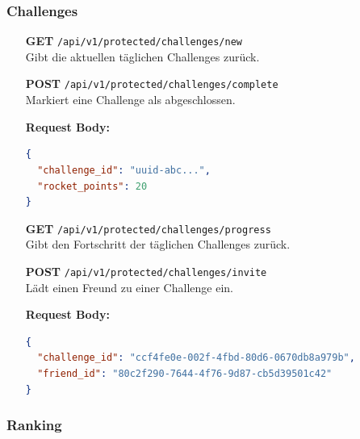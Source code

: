 \documentclass[11pt,a4paper]{article}
\begin{document}
\subsubsection{Challenges}

\begin{itemize}[leftmargin=1.5cm]
    \item[\textbf{GET}] \texttt{/api/v1/protected/challenges/new} \\
    Gibt die aktuellen täglichen Challenges zurück.

    \item[\textbf{POST}] \texttt{/api/v1/protected/challenges/complete} \\
    Markiert eine Challenge als abgeschlossen.

    \textbf{Request Body:}
    \begin{lstlisting}[language=json]
{
  "challenge_id": "uuid-abc...",
  "rocket_points": 20
}
    \end{lstlisting}

    \item[\textbf{GET}] \texttt{/api/v1/protected/challenges/progress} \\
    Gibt den Fortschritt der täglichen Challenges zurück.

    \item[\textbf{POST}] \texttt{/api/v1/protected/challenges/invite} \\
    Lädt einen Freund zu einer Challenge ein.

    \textbf{Request Body:}
    \begin{lstlisting}[language=json]
{
  "challenge_id": "ccf4fe0e-002f-4fbd-80d6-0670db8a979b",
  "friend_id": "80c2f290-7644-4f76-9d87-cb5d39501c42"
}
    \end{lstlisting}
\end{itemize}

\subsubsection{Ranking}
\end{document}
